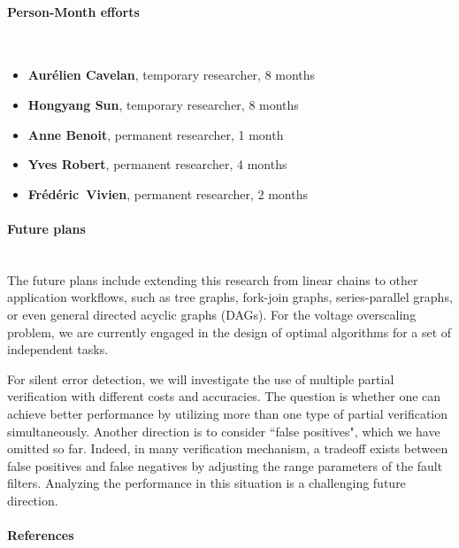 \begin{refsection}
\paragraph{Person-Month efforts}~\\


\begin{itemize}
	\item {\bf Aur\'elien Cavelan}, temporary researcher, 8 months
	\item {\bf Hongyang Sun}, temporary researcher, 8 months
	\item {\bf Anne Benoit}, permanent researcher, 1 month
	\item {\bf Yves Robert}, permanent researcher, 4 months
	\item {\bf Fr\'{e}d\'{e}ric~Vivien}, permanent researcher, 2 months
\end{itemize}

\paragraph{Future plans}~\\

The future plans include extending this research from linear chains to other application workflows, such as tree graphs, fork-join graphs, series-parallel graphs, or even general directed acyclic graphs (DAGs). For the voltage overscaling problem, we are currently engaged in the design of optimal algorithms for a set of independent tasks.

For silent error detection, we will investigate the use of multiple partial verification with different costs and accuracies. The question is whether one can achieve better performance by utilizing more than one type of partial verification simultaneously. Another direction is to consider ``false positives", which we have omitted so far. Indeed, in many verification mechanism, a tradeoff exists between false positives and false negatives by adjusting the range parameters of the fault filters. Analyzing the performance in this situation is a challenging future direction.

\paragraph{References}~\\

\printbibliography[heading=none,notkeyword=own]

\end{refsection}
